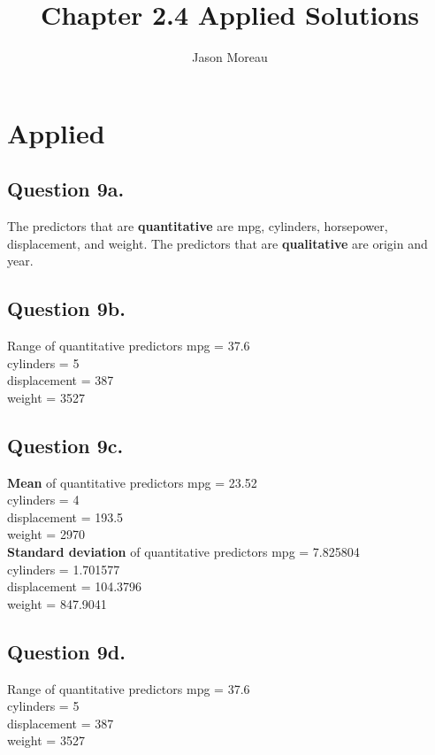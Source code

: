 \documentclass{article}
\title{Chapter 2.4 Applied Solutions}
\author{Jason Moreau}
\begin{document}
\maketitle
\section*{Applied}

\subsection*{Question 9a.}
The predictors that are \textbf{quantitative} are mpg, cylinders, horsepower, displacement, and weight. The predictors that are \textbf{qualitative} are origin and year. \newline

\subsection*{Question 9b.}
Range of quantitative predictors \newline
mpg = 37.6  \\
cylinders = 5 \\
displacement = 387 \\
weight = 3527 \\

\subsection*{Question 9c.}
\textbf{Mean} of quantitative predictors \newline
mpg = 23.52  \\
cylinders = 4 \\
displacement = 193.5\\
weight = 2970 \\
\newline
\textbf{Standard deviation} of quantitative predictors \newline
mpg = 7.825804  \\
cylinders = 1.701577 \\
displacement = 104.3796 \\
weight = 847.9041 \\

\subsection*{Question 9d.}
Range of quantitative predictors \newline
mpg = 37.6  \\
cylinders = 5 \\
displacement = 387 \\
weight = 3527 \\
\end{document}
